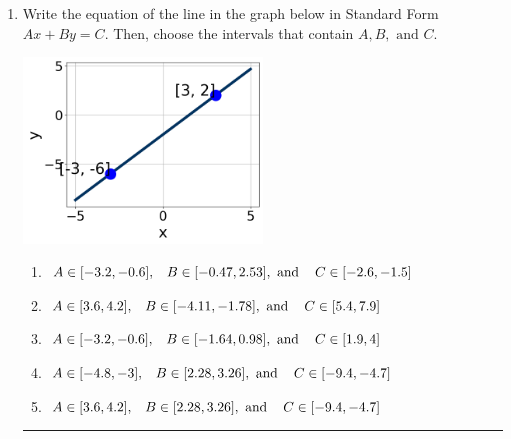 \documentclass[14pt]{extbook}
\newcommand{\litem}[1]{\item#1\hspace*{-1cm}\rule{\textwidth}{0.4pt}}
\begin{document}
\begin{enumerate}
{\begin{enumerate}[label=\Alph*.]
\end{enumerate} }
\litem{
Write the equation of the line in the graph below in Standard Form $Ax+By=C$. Then, choose the intervals that contain $A, B, \text{ and } C$.
\begin{center}
    \includegraphics[width=0.5\textwidth]{../Figures/linearGraphToStandardCopyB.png}
\end{center}
\begin{enumerate}[label=\Alph*.]
\item \( A \in [-3.2, -0.6], \hspace{3mm} B \in [-0.47, 2.53], \text{ and } \hspace{3mm} C \in [-2.6, -1.5] \)
\item \( A \in [3.6, 4.2], \hspace{3mm} B \in [-4.11, -1.78], \text{ and } \hspace{3mm} C \in [5.4, 7.9] \)
\item \( A \in [-3.2, -0.6], \hspace{3mm} B \in [-1.64, 0.98], \text{ and } \hspace{3mm} C \in [1.9, 4] \)
\item \( A \in [-4.8, -3], \hspace{3mm} B \in [2.28, 3.26], \text{ and } \hspace{3mm} C \in [-9.4, -4.7] \)
\item \( A \in [3.6, 4.2], \hspace{3mm} B \in [2.28, 3.26], \text{ and } \hspace{3mm} C \in [-9.4, -4.7] \)


\end{enumerate}}
\end{enumerate}
\end{document}
